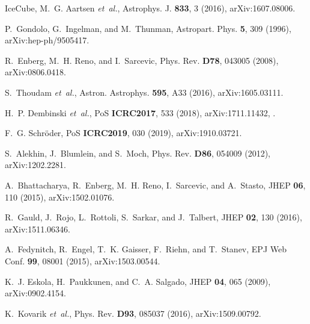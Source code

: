 \documentclass[a4paper,11pt]{article}
\begin{document}
\begin{thebibliography}{99}
IceCube, M.~G. Aartsen {\em et~al.},
\newblock Astrophys. J. {\bf 833}, 3 (2016), arXiv:1607.08006.

P.~Gondolo, G.~Ingelman, and M.~Thunman,
\newblock Astropart. Phys. {\bf 5}, 309 (1996), arXiv:hep-ph/9505417.

R.~Enberg, M.~H. Reno, and I.~Sarcevic,
\newblock Phys. Rev. {\bf D78}, 043005 (2008), arXiv:0806.0418.

S.~Thoudam {\em et~al.},
\newblock Astron. Astrophys. {\bf 595}, A33 (2016), arXiv:1605.03111.

H.~P. Dembinski {\em et~al.},
\newblock PoS {\bf ICRC2017}, 533 (2018), arXiv:1711.11432,
\newblock [35,533(2017)].

F.~G. Schr{\"o}der,
\newblock PoS {\bf ICRC2019}, 030 (2019), arXiv:1910.03721.

S.~Alekhin, J.~Blumlein, and S.~Moch,
\newblock Phys. Rev. {\bf D86}, 054009 (2012), arXiv:1202.2281.

A.~Bhattacharya, R.~Enberg, M.~H. Reno, I.~Sarcevic, and A.~Stasto,
\newblock JHEP {\bf 06}, 110 (2015), arXiv:1502.01076.

R.~Gauld, J.~Rojo, L.~Rottoli, S.~Sarkar, and J.~Talbert,
\newblock JHEP {\bf 02}, 130 (2016), arXiv:1511.06346.

A.~Fedynitch, R.~Engel, T.~K. Gaisser, F.~Riehn, and T.~Stanev,
\newblock EPJ Web Conf. {\bf 99}, 08001 (2015), arXiv:1503.00544.

K.~J. Eskola, H.~Paukkunen, and C.~A. Salgado,
\newblock JHEP {\bf 04}, 065 (2009), arXiv:0902.4154.

K.~Kovarik {\em et~al.},
\newblock Phys. Rev. {\bf D93}, 085037 (2016), arXiv:1509.00792.




\end{thebibliography}
\end{document}
